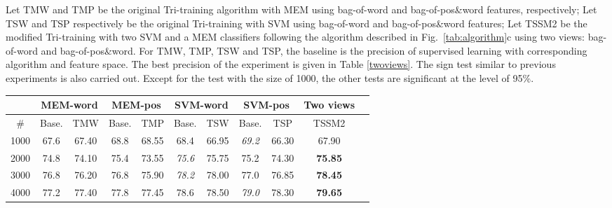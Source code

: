 \documentclass[english]{jnlp_1.4}
\begin{document}
Let TMW and TMP be the original Tri-training algorithm with MEM
using bag-of-word and bag-of-pos\&word features, respectively; Let
TSW and TSP respectively be the original Tri-training with SVM
using bag-of-word and bag-of-pos\&word features; Let TSSM2 be the
modified Tri-training with two SVM and a MEM classifiers following
the algorithm described in Fig.~\ref{tab:algorithm}c using two
views: bag-of-word and bag-of-pos\&word. For TMW, TMP, TSW and
TSP, the baseline is the precision of supervised learning with
corresponding algorithm and feature space. The best precision of
the experiment is given in Table \ref{twoviews}. The sign test
similar to previous experiments is also carried out. Except for
the test with the size of 1000, the other tests are significant at
the level of 95\%.

\begin{table}[b]
\label{twoviews_2}
\centering 
\begin{tabular}{|c||c|c||c|c||c|c||c|c||c|c||}
  \hline
   &
  \multicolumn{2}{|c|}{MEM-word} &
  \multicolumn{2}{|c|}{MEM-pos} &
  \multicolumn{2}{|c|}{SVM-word} &
  \multicolumn{2}{|c|}{SVM-pos}
  & Two views \\
  \hline
  \# &  Base. & TMW &  Base. & TMP &  Base. & TSW &  Base. & TSP &   TSSM2  \\
  \hline
  1000 & 67.6  & 67.40 & 68.8 & 68.55 &  68.4 &  66.95 & \textit{69.2}  & 66.30 &  67.90  \\
  2000 & 74.8  & 74.10 & 75.4 & 73.55 &  \textit{75.6} &  75.75 & 75.2  & 74.30 &  \textbf{75.85}  \\
  3000 & 76.8  & 76.20 & 76.8 & 75.90 &  \textit{78.2} &  78.00 & 77.0  & 76.85 &  \textbf{78.45}  \\
  4000 & 77.2  & 77.40 & 77.8 & 77.45 &  78.6 &  78.50 & \textit{79.0}  & 78.30 &  \textbf{79.65}  \\
  \hline
\end{tabular}
\end{table}
\end{document}
